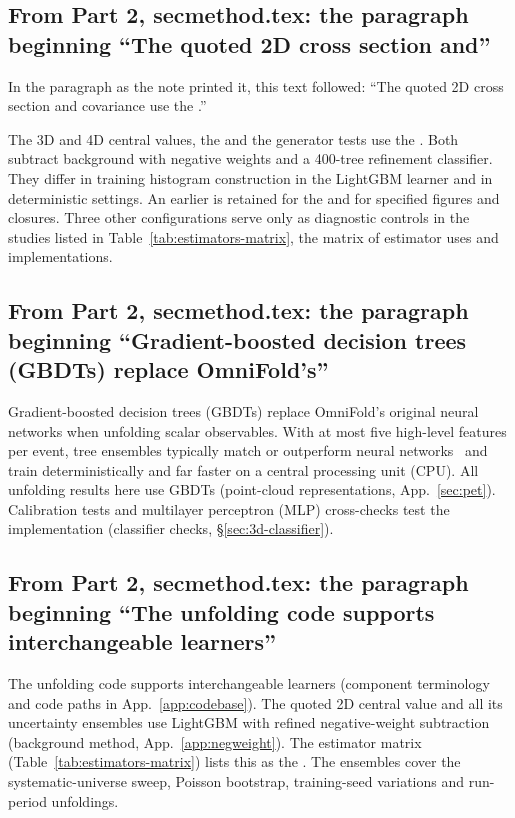 \subsection{From Part 2, secmethod.tex: the paragraph beginning ``The quoted 2D cross section and''}
In the paragraph as the note printed it, this text followed: ``The quoted 2D cross section and covariance use the \estTwoD{}.''\par
The 3D and 4D central values, the \resSixteen{} and the generator tests use the \estMultiD{}. Both subtract background with negative weights and a 400-tree refinement classifier. They differ in training histogram construction in the LightGBM learner and in deterministic settings. An earlier \estPurity{} is retained for the \resFiveAxis{} and for specified figures and closures. Three other configurations serve only as diagnostic controls in the studies listed in Table~\ref{tab:estimators-matrix}, the matrix of estimator uses and implementations.

\subsection{From Part 2, secmethod.tex: the paragraph beginning ``Gradient-boosted decision trees (GBDTs) replace OmniFold's''}
Gradient-boosted decision trees (GBDTs) replace OmniFold's original neural networks when unfolding scalar observables. With at most five high-level features per event, tree ensembles typically match or outperform neural networks~\cite{Grinsztajn:2022tabular} and train deterministically and far faster on a central processing unit (CPU). All unfolding results here use GBDTs (point-cloud representations, App.~\ref{sec:pet}). Calibration tests and multilayer perceptron (MLP) cross-checks test the implementation (classifier checks, \S\ref{sec:3d-classifier}).

\subsection{From Part 2, secmethod.tex: the paragraph beginning ``The unfolding code supports interchangeable learners''}
The unfolding code supports interchangeable learners (component terminology and code paths in App.~\ref{app:codebase}). The quoted 2D central value and all its uncertainty ensembles use LightGBM with refined negative-weight subtraction (background method, App.~\ref{app:negweight}). The estimator matrix (Table~\ref{tab:estimators-matrix}) lists this as the \estTwoD{}. The ensembles cover the systematic-universe sweep, Poisson bootstrap, training-seed variations and run-period unfoldings.

